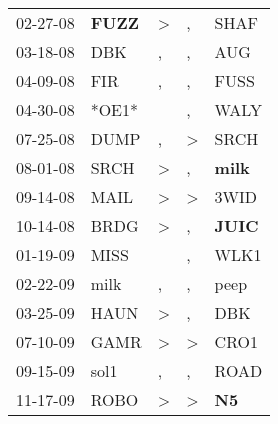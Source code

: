 \begin{supertabular}{p{0.07\textwidth}p{0.06\textwidth}p{0.02\textwidth}p{0.02\textwidth}p{0.06\textwidth}}
          02-27-08\textsuperscript{} &  \textbf{FUZZ\textsuperscript{}} &     \textgreater &                , &           SHAF\textsuperscript{} \\
          03-18-08\textsuperscript{} &            DBK\textsuperscript{} &                , &                , &            AUG\textsuperscript{} \\
          04-09-08\textsuperscript{} &            FIR\textsuperscript{} &                , &                , &           FUSS\textsuperscript{} \\
          04-30-08\textsuperscript{} &                            *OE1* &                  &                , &           WALY\textsuperscript{} \\
          07-25-08\textsuperscript{} &           DUMP\textsuperscript{} &                , &     \textgreater &           SRCH\textsuperscript{} \\
          08-01-08\textsuperscript{} &           SRCH\textsuperscript{} &     \textgreater &                , &  \textbf{milk\textsuperscript{}} \\
          09-14-08\textsuperscript{} &           MAIL\textsuperscript{} &     \textgreater &     \textgreater &           3WID\textsuperscript{} \\
          10-14-08\textsuperscript{} &           BRDG\textsuperscript{} &     \textgreater &                , &  \textbf{JUIC\textsuperscript{}} \\
          01-19-09\textsuperscript{} &           MISS\textsuperscript{} &                  &                , &           WLK1\textsuperscript{} \\
          02-22-09\textsuperscript{} &           milk\textsuperscript{} &                , &                , &           peep\textsuperscript{} \\
          03-25-09\textsuperscript{} &           HAUN\textsuperscript{} &     \textgreater &                , &            DBK\textsuperscript{} \\
          07-10-09\textsuperscript{} &           GAMR\textsuperscript{} &     \textgreater &     \textgreater &           CRO1\textsuperscript{} \\
          09-15-09\textsuperscript{} &           sol1\textsuperscript{} &                , &                , &           ROAD\textsuperscript{} \\
          11-17-09\textsuperscript{} &           ROBO\textsuperscript{} &     \textgreater &     \textgreater &    \textbf{N5\textsuperscript{}} \\

\end{supertabular}

